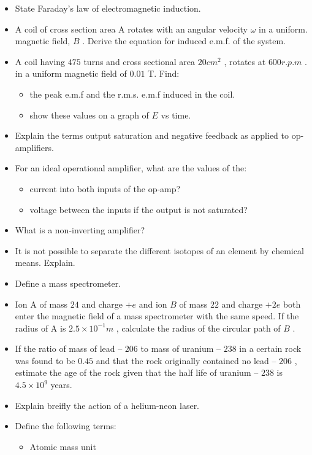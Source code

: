 \documentclass{article}
\begin{document}
\begin{itemize}
\begin{itemize}
\end{itemize}
\item State Faraday’s law of electromagnetic induction. 
\item A coil of cross section area A rotates with an angular velocity $ \omega $ in a uniform. magnetic field, $ B$ . Derive the equation for induced e.m.f. of the system.
\item A coil having $ 475$ turns and cross sectional area $ 20 cm^{2}$ , rotates at $ 600r.p.m$ . in a uniform magnetic field of $ 0.01$ T. Find:
 \begin{itemize}
\item the peak e.m.f and the r.m.s. e.m.f induced in the coil. 
\item show these values on a graph of $ E$ vs time. 
\end{itemize}
\item Explain the terms output saturation and negative feedback as applied to op-amplifiers. 
\item For an ideal operational amplifier, what are the values of the:
 \begin{itemize}
\item current into both inputs of the op-amp? 
\item voltage between the inputs if the output is not saturated? 
\end{itemize}
\item What is a non-inverting amplifier? 
\item It is not possible to separate the different isotopes of an element by chemical means.  Explain.
\item Define a mass spectrometer. 
\item Ion A of mass $ 24$ and charge $ +e$ and ion $ B$ of mass $ 22$ and charge $ +2e$ both enter the magnetic field of a mass spectrometer with the same speed. If the radius of A is $ 2.5 \times 10^{-1}m$ , calculate the radius of the circular path of $ B$ . 
\item If the ratio of mass of lead – $ 206$  to mass of uranium – $ 238$ in a certain rock was found to be $ 0.45$ and that the rock originally contained no lead – $ 206$ , estimate the age of the rock given that the half life of uranium – $ 238$ is $ 4.5 \times 10^{9}$ years.
\item Explain breifly the action of a helium-neon laser.
\item Define the following terms:
 \begin{itemize}
\item Atomic mass unit

\end{itemize}
\end{itemize}
\end{document}

